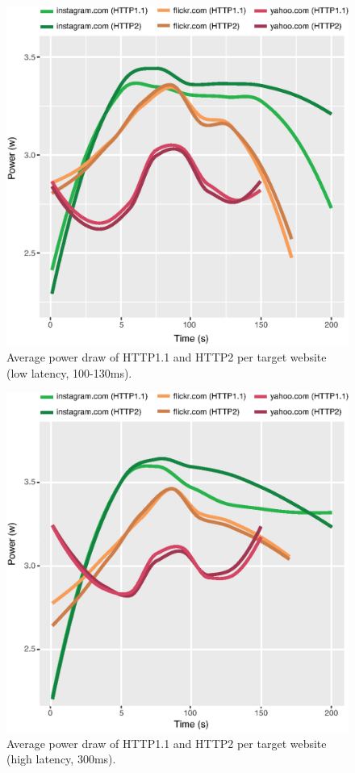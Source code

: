 \documentclass{article}
\begin{document}
\begin{figure}[h!]
    \centering
    \includegraphics[width=\linewidth]{images/average}
    \caption{Average power draw of HTTP1.1 and HTTP2 per target website (low latency, 100-130ms).}
    \label{fig:average}
\end{figure}

\begin{figure}[h!]
    \centering
    \includegraphics[width=\linewidth]{images/average-vpn}
    \caption{Average power draw of HTTP1.1 and HTTP2 per target website (high latency, 300ms).}
    \label{fig:average-vpn}
\end{figure}
\end{document}
